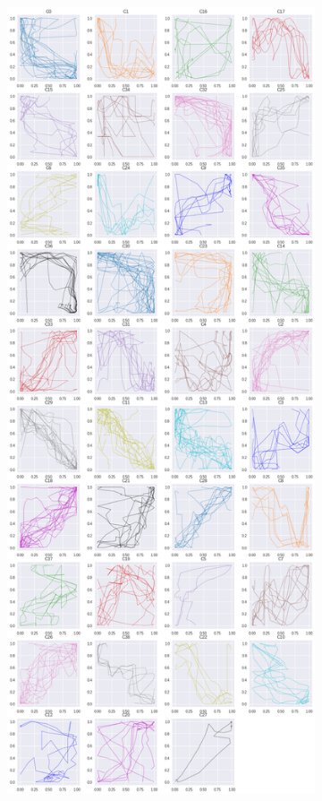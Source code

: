 \begin{figure}[h!]
  \centering
  \hspace{1em}
   \begin{subfigure}[c]{0.37\linewidth}
     \includegraphics[width=\linewidth]{figs/clusters/CLU_AP_ALL[EDR;e=.203].png}

\end{subfigure}
\end{figure}
